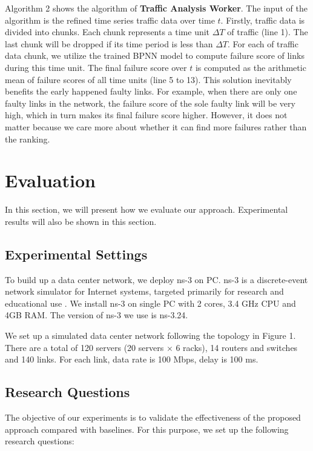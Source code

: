 \documentclass{sig-alternate-05-2015}
\begin{document}
Algorithm 2 shows the algorithm of \textbf{Traffic Analysis Worker}. The input of the algorithm is the refined time series traffic data over time $t$. Firstly, traffic data is divided into chunks. Each chunk represents a time unit $\Delta T$ of traffic (line 1). The last chunk will be dropped if its time period is less than $\Delta T$. For each of traffic data chunk, we utilize the trained BPNN model to compute failure score of links during this time unit. The final failure score over $t$ is computed as the arithmetic mean of failure scores of all time units (line 5 to 13). This solution inevitably benefits the early happened faulty links. For example, when there are only one faulty links in the network, the failure score of the sole faulty link will be very high, which in turn makes its final failure score higher. However, it does not matter because we care more about whether it can find more failures rather than the ranking.


\section{Evaluation}
In this section, we will present how we evaluate our approach. Experimental results will also be shown in this section.

\subsection{Experimental Settings}
To build up a data center network, we deploy ns-3 on PC. ns-3 is a discrete-event network simulator for Internet systems, targeted primarily for research and educational use \cite{henderson2008network}. We install ns-3 on single PC with 2 cores, 3.4 GHz CPU and 4GB RAM. The version of ns-3 we use is ns-3.24.

We set up a simulated data center network following the topology in Figure 1. There are a total of 120 servers (20 servers $\times$ 6 racks), 14 routers and switches and 140 links. For each link, data rate is 100 Mbps, delay is 100 ms.

\subsection{Research Questions}
The objective of our experiments is to validate the effectiveness of the proposed approach compared with baselines. For this purpose, we set up the following research questions:
\end{document}
